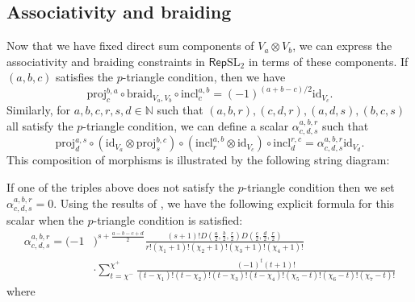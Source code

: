 \documentclass[11pt,a4paper,reqno]{amsart}
\theoremstyle{definition}
\numberwithin{equation}{section}
\newcommand{\braid}{\mathrm{braid}}
\newcommand{\Rep}{\mathsf{Rep}}
\newcommand{\mN}{\mathbb{N}}
\newcommand{\id}{\mathrm{id}}
\newcommand{\SL}{\mathrm{SL}}
\newcommand{\incl}{\mathrm{incl}}
\newcommand{\proj}{\mathrm{proj}}
\begin{document}
\subsection{Associativity and braiding} Now that we have fixed direct sum components of $V_a\otimes V_b$, we can express the associativity and braiding constraints in $\Rep\SL_2$ in terms of these components. If $(a,b,c)$ satisfies the $p$-triangle condition, then we have
\begin{equation}\label{EqnBraidComposition}
\proj_c^{b,a}\circ \braid_{V_a,V_b}\circ\incl_c^{a,b}=(-1)^{(a+b-c)/2}\id_{V_c}.
\end{equation}
Similarly, for $a,b,c,r,s,d\in\mN$ such that $(a,b,r),(c,d,r),(a,d,s),(b,c,s)$ all satisfy the $p$-triangle condition, we can define a scalar $\alpha^{a,b,r}_{c,d,s}$ such that
\begin{equation}\label{EqnAssocComposition}
\proj_d^{a,s}\circ(\id_{V_a}\otimes\proj_s^{b,c})\circ(\incl_r^{a,b}\otimes\id_{V_c})\circ\incl_d^{r,c}=\alpha^{a,b,r}_{c,d,s}\id_{V_d}.
\end{equation}
This composition of morphisms is illustrated by the following string diagram:
\begin{center}
\end{center}
If one of the triples above does not satisfy the $p$-triangle condition then we set $\alpha^{a,b,r}_{c,d,s}=0$. Using the results of \cite{sl2comb}, we have the following explicit formula for this scalar when the $p$-triangle condition is satisfied:
\begin{equation}\label{EqnAssociator}
\begin{split}
\alpha^{a,b,r}_{c,d,s}=(-1&)^{s+\frac{a-b-c+d}2}\frac{(s+1)!D(\frac a2,\frac b2,\frac r2)D(\frac c2,\frac d2,\frac r2)}{r!(\chi_1+1)!(\chi_2+1)!(\chi_3+1)!(\chi_4+1)!}\\
&\cdot\sum_{t=\chi^-}^{\chi^+}\frac{(-1)^t(t+1)!}{(t-\chi_1)!(t-\chi_2)!(t-\chi_3)!(t-\chi_4)!(\chi_5-t)!(\chi_6-t)!(\chi_7-t)!}
\end{split}
\end{equation}
where
\end{document}
